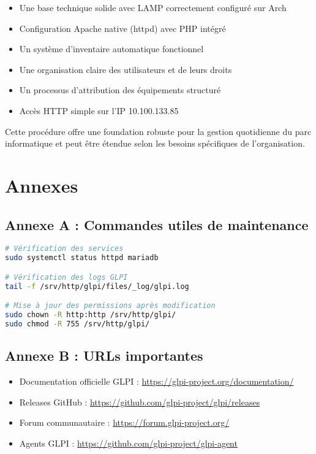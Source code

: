 \documentclass[12pt,a4paper]{article}
\begin{document}
\begin{itemize}
    \item Une base technique solide avec LAMP correctement configuré sur Arch
    \item Configuration Apache native (httpd) avec PHP intégré
    \item Un système d'inventaire automatique fonctionnel
    \item Une organisation claire des utilisateurs et de leurs droits
    \item Un processus d'attribution des équipements structuré
    \item Accès HTTP simple sur l'IP 10.100.133.85
\end{itemize}

Cette procédure offre une foundation robuste pour la gestion quotidienne du parc informatique et peut être étendue selon les besoins spécifiques de l'organisation.

\newpage
\section{Annexes}

\subsection{Annexe A : Commandes utiles de maintenance}

\begin{lstlisting}[language=bash, caption=Maintenance GLPI]
# Vérification des services
sudo systemctl status httpd mariadb

# Vérification des logs GLPI
tail -f /srv/http/glpi/files/_log/glpi.log

# Mise à jour des permissions après modification
sudo chown -R http:http /srv/http/glpi/
sudo chmod -R 755 /srv/http/glpi/
\end{lstlisting}

\subsection{Annexe B : URLs importantes}

\begin{itemize}
    \item Documentation officielle GLPI : \url{https://glpi-project.org/documentation/}
    \item Releases GitHub : \url{https://github.com/glpi-project/glpi/releases}
    \item Forum communautaire : \url{https://forum.glpi-project.org/}
    \item Agents GLPI : \url{https://github.com/glpi-project/glpi-agent}
\end{itemize}
\end{document}
